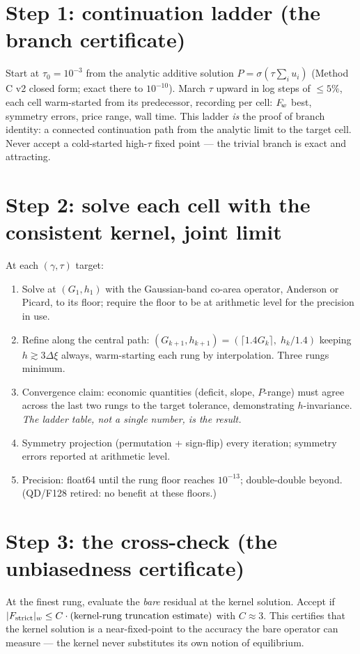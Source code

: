 \section{Step 1: continuation ladder (the branch certificate)}
Start at $\tau_0 = 10^{-3}$ from the analytic additive solution
$P = \sigma(\tau \sum_i u_i)$ (Method C v2 closed form; exact there to
$10^{-10}$). March $\tau$ upward in log steps of $\le 5\%$, each cell
warm-started from its predecessor, recording per cell: $F_{\!w}$ best,
symmetry errors, price range, wall time. This ladder \emph{is} the
proof of branch identity: a connected continuation path from the
analytic limit to the target cell. Never accept a cold-started
high-$\tau$ fixed point --- the trivial branch is exact and
attracting.

\section{Step 2: solve each cell with the consistent kernel, joint limit}
At each $(\gamma, \tau)$ target:
\begin{enumerate}\itemsep2pt
  \item Solve at $(G_1, h_1)$ with the Gaussian-band co-area operator,
        Anderson or Picard, to its floor; require the floor to be at
        arithmetic level for the precision in use.
  \item Refine along the central path: $(G_{k+1}, h_{k+1}) =
        (\lceil 1.4 G_k \rceil,\; h_k / 1.4)$ keeping
        $h \gtrsim 3\Delta\xi$ always, warm-starting each rung by
        interpolation. Three rungs minimum.
  \item Convergence claim: economic quantities (deficit, slope,
        $P$-range) must agree across the last two rungs to the target
        tolerance, demonstrating $h$-invariance. \emph{The ladder
        table, not a single number, is the result.}
  \item Symmetry projection (permutation + sign-flip) every iteration;
        symmetry errors reported at arithmetic level.
  \item Precision: float64 until the rung floor reaches $10^{-13}$;
        double-double beyond. (QD/F128 retired: no benefit at these
        floors.)
\end{enumerate}

\section{Step 3: the \strict{} cross-check (the unbiasedness certificate)}
At the finest rung, evaluate the \emph{bare} \strict{} residual at the
kernel solution. Accept if
$|F_{\rm strict}|_w \le C \cdot (\text{kernel-rung truncation
estimate})$ with $C \approx 3$. This certifies that the kernel solution
is a \strict{} near-fixed-point to the accuracy the bare operator can
measure --- the kernel never substitutes its own notion of equilibrium.

